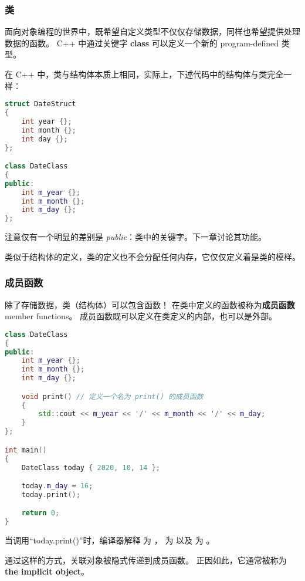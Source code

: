 \documentclass[../../LearnCpp.tex]{subfiles}
\begin{document}

\subsubsection*{类}

面向对象编程的世界中，既希望自定义类型不仅仅存储数据，同样也希望提供处理数据的函数。
C++ 中通过关键字 \textbf{class} 可以定义一个新的 program-defined 类型。

在 C++ 中，类与结构体本质上相同，实际上，下述代码中的结构体与类完全一样：

\begin{lstlisting}[language=C++]
struct DateStruct
{
    int year {};
    int month {};
    int day {};
};

class DateClass
{
public:
    int m_year {};
    int m_month {};
    int m_day {};
};
\end{lstlisting}

注意仅有一个明显的差别是 \textit{public}：类中的关键字。下一章讨论其功能。

类似于结构体的定义，类的定义也不会分配任何内存，它仅仅定义着是类的模样。

\subsubsection*{成员函数}

除了存储数据，类（结构体）可以包含函数！
在类中定义的函数被称为\textbf{成员函数} member functions。
成员函数既可以定义在类定义的内部，也可以是外部。

\begin{lstlisting}[language=C++]
class DateClass
{
public:
    int m_year {};
    int m_month {};
    int m_day {};

    void print() // 定义一个名为 print() 的成员函数
    {
        std::cout << m_year << '/' << m_month << '/' << m_day;
    }
};

int main()
{
    DateClass today { 2020, 10, 14 };

    today.m_day = 16;
    today.print();

    return 0;
}
\end{lstlisting}

当调用“today.print()”时，编译器解释  为 ，
 为  以及  为 。

通过这样的方式，关联对象被隐式传递到成员函数。
正因如此，它通常被称为 \textbf{the implicit object}。
\end{document}
